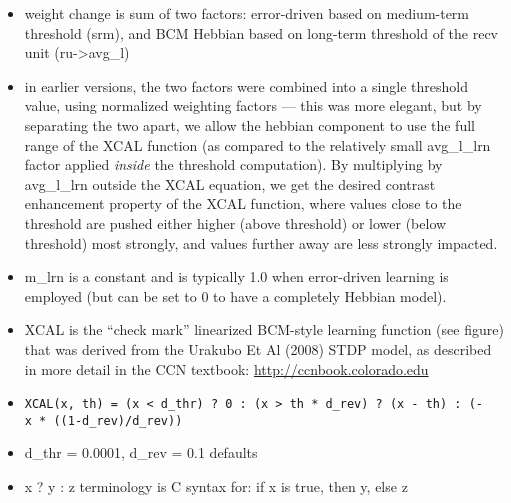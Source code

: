 \begin{itemize}
\begin{itemize}
    \begin{itemize}
    \tightlist
    \item
      weight change is sum of two factors: error-driven based on
      medium-term threshold (srm), and BCM Hebbian based on long-term
      threshold of the recv unit (ru-\textgreater{}avg\_l)
    \item
      in earlier versions, the two factors were combined into a single
      threshold value, using normalized weighting factors --- this was
      more elegant, but by separating the two apart, we allow the
      hebbian component to use the full range of the XCAL function (as
      compared to the relatively small avg\_l\_lrn factor applied
      \emph{inside} the threshold computation). By multiplying by
      avg\_l\_lrn outside the XCAL equation, we get the desired contrast
      enhancement property of the XCAL function, where values close to
      the threshold are pushed either higher (above threshold) or lower
      (below threshold) most strongly, and values further away are less
      strongly impacted.
    \item
      m\_lrn is a constant and is typically 1.0 when error-driven
      learning is employed (but can be set to 0 to have a completely
      Hebbian model).
    \item
      XCAL is the ``check mark'' linearized BCM-style learning function
      (see figure) that was derived from the Urakubo Et Al (2008) STDP
      model, as described in more detail in the CCN textbook:
      \url{http://ccnbook.colorado.edu}
    \item
      \texttt{XCAL(x,\ th)\ =\ (x\ \textless{}\ d\_thr)\ ?\ 0\ :\ (x\ \textgreater{}\ th\ *\ d\_rev)\ ?\ (x\ -\ th)\ :\ (-x\ *\ ((1-d\_rev)/d\_rev))}
    \item
      d\_thr = 0.0001, d\_rev = 0.1 defaults
    \item
      x ? y : z terminology is C syntax for: if x is true, then y, else
      z
    \end{itemize}
  \end{itemize}
\end{itemize}

